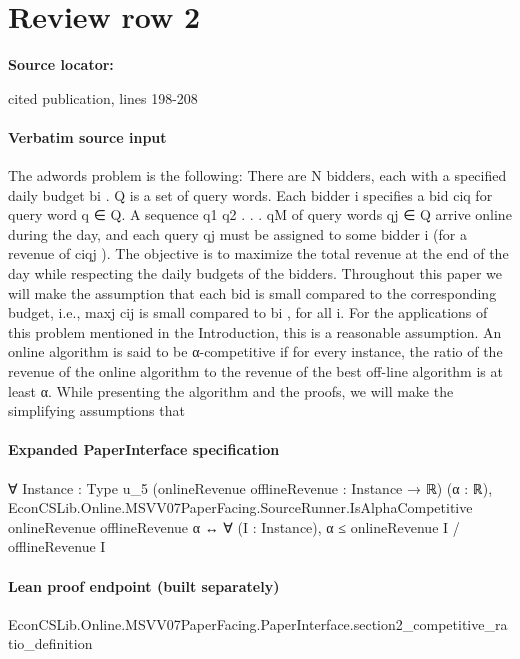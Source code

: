 \documentclass[10pt]{article}
\begin{document}
\section*{Review row 2}
\textbf{Source locator:} {\footnotesize\raggedright cited publication, lines 198-\allowbreak{}208\par}
\paragraph{Verbatim source input}
\begin{ReviewVerbatim}
The adwords problem is the following: There are N bidders, each with a specified daily budget
bi . Q is a set of query words. Each bidder i specifies a bid ciq for query word q ∈ Q. A
sequence q1 q2 . . . qM of query words qj ∈ Q arrive online during the day, and each query qj
must be assigned to some bidder i (for a revenue of ciqj ). The objective is to maximize the
total revenue at the end of the day while respecting the daily budgets of the bidders.
Throughout this paper we will make the assumption that each bid is small compared to the
corresponding budget, i.e., maxj cij is small compared to bi , for all i. For the applications of
this problem mentioned in the Introduction, this is a reasonable assumption.
An online algorithm is said to be α-competitive if for every instance, the ratio of the revenue
of the online algorithm to the revenue of the best off-line algorithm is at least α.
While presenting the algorithm and the proofs, we will make the simplifying assumptions that
\end{ReviewVerbatim}


\paragraph{Expanded PaperInterface specification}
\begin{ReviewVerbatim}
∀ {Instance : Type u_5} (onlineRevenue offlineRevenue : Instance → ℝ) (α : ℝ),
  EconCSLib.Online.MSVV07PaperFacing.SourceRunner.IsAlphaCompetitive onlineRevenue offlineRevenue α ↔
    ∀ (I : Instance), α ≤ onlineRevenue I / offlineRevenue I
\end{ReviewVerbatim}

\paragraph{Lean proof endpoint (built separately)}\begin{ReviewVerbatim}
EconCSLib.Online.MSVV07PaperFacing.PaperInterface.section2_competitive_ratio_definition
\end{ReviewVerbatim}
\end{document}
